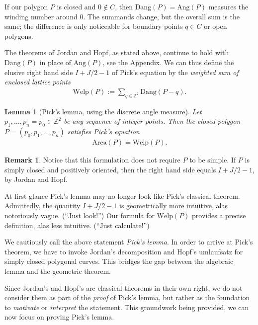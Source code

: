 \documentclass[a4paper]{amsart}
\numberwithin{equation}{section}
\theoremstyle{plain}
\newtheorem{lemma}[theorem]{Lemma}
\theoremstyle{definition}
\newtheorem{remark}[theorem]{Remark}
\newcommand{\Z}{\mathbb{Z}}
\newcommand{\Area}{\mathrm{Area}}
\newcommand{\Ang}{\mathrm{Ang}}
\newcommand{\Dang}{\mathrm{Dang}}
\newcommand{\Welp}{\mathrm{Welp}}
\begin{document}
If our polygon $P$ is closed and $0 \notin C$,
then $\Dang(P) = \Ang(P)$ measures the winding number around $0$.
The summands change, but the overall sum is the same;
the difference is only noticeable for boundary points $q \in C$ or open polygons.

The theorems of Jordan and Hopf, as stated above, continue
to hold with $\Dang(P)$ in place of $\Ang(P)$, see the Appendix.
We can thus define the elusive right hand side $I + J/2 - 1$ of Pick's equation
by the \emph{weighted sum of enclosed lattice points}
\begin{align}
  \label{eq:Welp}
  \Welp(P) := \sum_{q \in \Z^2} \Dang(P-q) .
\end{align}

\begin{lemma}[Pick's lemma, using the discrete angle measure] \label{lem:PickDiscrete}
  Let $p_1,\ldots,p_n=p_0 \in \Z^2$ be any sequence of integer points.
  Then the closed polygon $P = (p_0,p_1,\ldots,p_n)$ satisfies Pick's equation 
  \begin{align}
    \Area(P) = \Welp(P) .
  \end{align}
\end{lemma}

\begin{remark}
  Notice that this formulation does not require $P$ to be simple.
  If $P$ is simply closed and positively oriented, 
  then the right hand side equals $I + J/2 - 1$,
  by Jordan and Hopf.

  At first glance Pick's lemma may no longer look like Pick's classical theorem.
  Admittedly, the quantity $I + J/2 - 1$ is geometrically more intuitive,
  alas notoriously vague. (``Just look!'') %
  Our formula for $\Welp(P)$ provides a precise definition,
  alas less intuitive. (``Just calculate!'')
  
  We cautiously call the above statement \emph{Pick's lemma}.
  In order to arrive at Pick's theorem,
  we have to invoke Jordan's decomposition and Hopf's umlaufsatz
  for simply closed polygonal curves.
  This bridges the gap between the algebraic lemma
  and the geometric theorem.

  Since Jordan's and Hopf's are classical theorems in their own right,
  we do not consider them as part of the \emph{proof} of Pick's lemma,
  but rather as the foundation to \emph{motivate} or \emph{interpret} the statement.
  This groundwork being provided, %
  we can now focus on proving Pick's lemma.
\end{remark}
\end{document}
